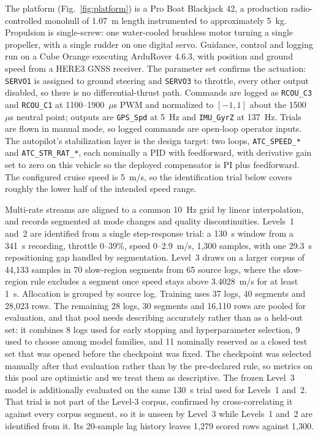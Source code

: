 \documentclass[conference]{IEEEtran}
\begin{document}
The platform (Fig.~\ref{fig:platform}) is a Pro Boat Blackjack 42, a production radio-controlled monohull of 1.07~m length instrumented to approximately 5~kg. Propulsion is single-screw: one water-cooled brushless motor turning a single propeller, with a single rudder on one digital servo. Guidance, control and logging run on a Cube Orange executing ArduRover 4.6.3, with position and ground speed from a HERE3 GNSS receiver. The parameter set confirms the actuation: \texttt{SERVO1} is assigned to ground steering and \texttt{SERVO3} to throttle, every other output disabled, so there is no differential-thrust path. Commands are logged as \texttt{RCOU\_C3} and \texttt{RCOU\_C1} at 1100--1900~$\mu$s PWM and normalized to $[-1,1]$ about the 1500~$\mu$s neutral point; outputs are \texttt{GPS\_Spd} at 5~Hz and \texttt{IMU\_GyrZ} at 137~Hz. Trials are flown in manual mode, so logged commands are open-loop operator inputs. The autopilot's stabilization layer is the design target: two loops, \texttt{ATC\_SPEED\_*} and \texttt{ATC\_STR\_RAT\_*}, each nominally a PID with feedforward, with derivative gain set to zero on this vehicle so the deployed compensator is PI plus feedforward. The configured cruise speed is 5~m/s, so the identification trial below covers roughly the lower half of the intended speed range.

Multi-rate streams are aligned to a common 10~Hz grid by linear interpolation, and records segmented at mode changes and quality discontinuities. Levels~1 and~2 are identified from a single step-response trial: a 130~s window from a 341~s recording, throttle 0--39\%, speed 0--2.9~m/s, 1{,}300 samples, with one 29.3~s repositioning gap handled by segmentation. Level~3 draws on a larger corpus of 44{,}133 samples in 70 slow-region segments from 65 source logs, where the slow-region rule excludes a segment once speed stays above 3.4028~m/s for at least 1~s. Allocation is grouped by source log. Training uses 37 logs, 40 segments and 28{,}023 rows. The remaining 28 logs, 30 segments and 16{,}110 rows are pooled for evaluation, and that pool needs describing accurately rather than as a held-out set: it combines 8 logs used for early stopping and hyperparameter selection, 9 used to choose among model families, and 11 nominally reserved as a closed test set that was opened before the checkpoint was fixed. The checkpoint was selected manually after that evaluation rather than by the pre-declared rule, so metrics on this pool are optimistic and we treat them as descriptive. The frozen Level~3 model is additionally evaluated on the same 130~s trial used for Levels~1 and~2. That trial is not part of the Level-3 corpus, confirmed by cross-correlating it against every corpus segment, so it is unseen by Level~3 while Levels~1 and~2 are identified from it. Its 20-sample lag history leaves 1{,}279 scored rows against 1{,}300.
\end{document}
